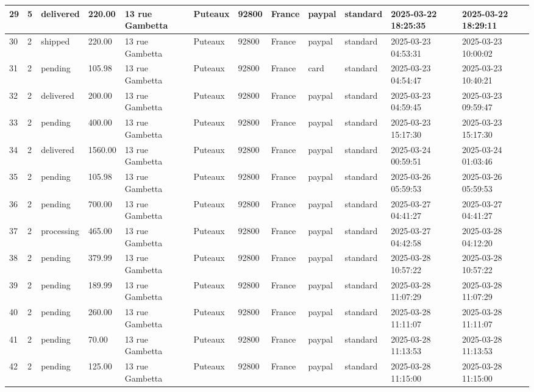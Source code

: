 \begin{longtable}{|l|l|l|l|l|l|l|l|l|l|l|l|}
29 & 5 & delivered & 220.00 & 13 rue Gambetta & Puteaux & 92800 & France & paypal & standard & 2025-03-22 18:25:35 & 2025-03-22 18:29:11 \\ \hline 
30 & 2 & shipped & 220.00 & 13 rue Gambetta & Puteaux & 92800 & France & paypal & standard & 2025-03-23 04:53:31 & 2025-03-23 10:00:02 \\ \hline 
31 & 2 & pending & 105.98 & 13 rue Gambetta & Puteaux & 92800 & France & card & standard & 2025-03-23 04:54:47 & 2025-03-23 10:40:21 \\ \hline 
32 & 2 & delivered & 200.00 & 13 rue Gambetta & Puteaux & 92800 & France & paypal & standard & 2025-03-23 04:59:45 & 2025-03-23 09:59:47 \\ \hline 
33 & 2 & pending & 400.00 & 13 rue Gambetta & Puteaux & 92800 & France & paypal & standard & 2025-03-23 15:17:30 & 2025-03-23 15:17:30 \\ \hline 
34 & 2 & delivered & 1560.00 & 13 rue Gambetta & Puteaux & 92800 & France & paypal & standard & 2025-03-24 00:59:51 & 2025-03-24 01:03:46 \\ \hline 
35 & 2 & pending & 105.98 & 13 rue Gambetta & Puteaux & 92800 & France & paypal & standard & 2025-03-26 05:59:53 & 2025-03-26 05:59:53 \\ \hline 
36 & 2 & pending & 700.00 & 13 rue Gambetta & Puteaux & 92800 & France & paypal & standard & 2025-03-27 04:41:27 & 2025-03-27 04:41:27 \\ \hline 
37 & 2 & processing & 465.00 & 13 rue Gambetta & Puteaux & 92800 & France & paypal & standard & 2025-03-27 04:42:58 & 2025-03-28 04:12:20 \\ \hline 
38 & 2 & pending & 379.99 & 13 rue Gambetta & Puteaux & 92800 & France & paypal & standard & 2025-03-28 10:57:22 & 2025-03-28 10:57:22 \\ \hline 
39 & 2 & pending & 189.99 & 13 rue Gambetta & Puteaux & 92800 & France & paypal & standard & 2025-03-28 11:07:29 & 2025-03-28 11:07:29 \\ \hline 
40 & 2 & pending & 260.00 & 13 rue Gambetta & Puteaux & 92800 & France & paypal & standard & 2025-03-28 11:11:07 & 2025-03-28 11:11:07 \\ \hline 
41 & 2 & pending & 70.00 & 13 rue Gambetta & Puteaux & 92800 & France & paypal & standard & 2025-03-28 11:13:53 & 2025-03-28 11:13:53 \\ \hline 
42 & 2 & pending & 125.00 & 13 rue Gambetta & Puteaux & 92800 & France & paypal & standard & 2025-03-28 11:15:00 & 2025-03-28 11:15:00 \\ \hline 

\end{longtable}
